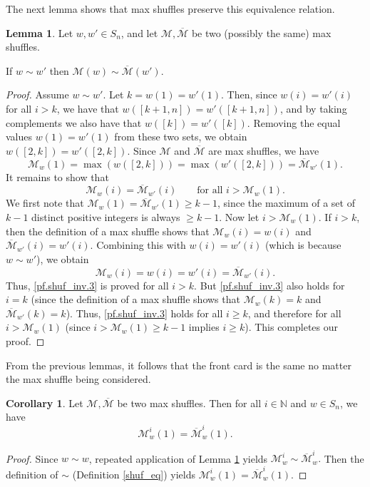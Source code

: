 \documentclass[final,nomarks]{dmtcs-episciences}
\theoremstyle{definition}
\newtheorem{lem}[thm]{Lemma}
\newtheorem{cor}[thm]{Corollary}
\theoremstyle{definition}
\theoremstyle{remark}
\newcommand{\M}{\mathcal{M}} %
\newcommand{\Mo}{\overline{\mathcal{M}}} %
\newcommand{\Mw}{\mathcal{M}_w} %
\newcommand{\Mow}{\Mo_w} %
\newcommand{\Mowp}{\Mo_{w'}} %
\newcommand{\tup}[1]{\left( #1 \right)}
\begin{document}
The next lemma shows that max shuffles preserve this equivalence relation.

\begin{lem}
    \label{shuf_inv}
    Let $w,w' \in S_n$, and let $\M,\Mo$ be two (possibly the same) max shuffles. 
    
    If $w \sim w'$ then $\M\tup{w} \sim \Mo\tup{w'}$.
\end{lem}

\begin{proof}
Assume $w \sim w'$.
Let $k = w\tup{1} = w'\tup{1}$.
Then, since $w\tup{i}=w'\tup{i}$ for all $i > k$, we have that $w\tup{[k+1,n]} = w'\tup{[k+1,n]}$, and by taking complements we also have that $w\tup{[k]}=w'\tup{[k]}$.
Removing the equal values $w(1) = w'(1)$ from these two sets, we obtain
$w\tup{[2,k]} = w'\tup{[2,k]}$.
Since $\M$ and $\Mo$ are max shuffles, we have
\[
\Mw\tup{1} = \max\tup{w\tup{[2,k]}} = \max\tup{w'\tup{[2,k]}} = \Mowp\tup{1}.
\]
It remains to show that
\begin{equation}
    \Mw\tup{i} = \Mowp\tup{i} \qquad \text{for all } i > \Mw\tup{1}.
    \label{pf.shuf_inv.3}
\end{equation}
We first note that $\Mw\tup{1} = \Mowp\tup{1} \ge k-1$, since the maximum of a set of $k-1$ distinct positive integers is always $\geq k-1$.
Now let $i > \Mw\tup{1}$.
If $i > k$, then the definition of a max shuffle shows that $\Mw\tup{i} = w\tup{i}$ and $ \Mowp\tup{i} = w'\tup{i}$. Combining this with $w\tup{i} = w'\tup{i} $ (which is because $w \sim w'$), we obtain
\[
\Mw\tup{i} = w\tup{i} = w'\tup{i} = \Mowp\tup{i} .
\]
Thus, \eqref{pf.shuf_inv.3} is proved for all $i > k$. But \eqref{pf.shuf_inv.3} also holds for $i = k$ (since the definition of a max shuffle shows that $\Mw\tup{k} = k$ and $\Mowp\tup{k} = k$).
Thus, \eqref{pf.shuf_inv.3} holds for all $i \geq k$, and therefore for all $i > \Mw\tup{1}$ (since $i > \Mw\tup{1} \ge k-1 $ implies $i \ge k$).
This completes our proof.
\end{proof}

From the previous lemmas, it follows that the front card is the same no matter the max shuffle being considered.
\begin{cor}
    \label{f_match}
    Let $ \M,\Mo $ be two max shuffles. Then for all $i \in \mathbb{N} $ and $w \in S_n$, we have
    \[
    \Mw^{i}\tup{ 1 } = \Mow^{i}\tup{ 1 }.
    \]
\end{cor}
\begin{proof}
Since $w \sim w$, repeated application of Lemma \ref{shuf_inv} yields $\Mw^{i} \sim \Mow^{i}.$ Then the definition of $\sim$ (Definition \ref{shuf_eq}) yields $\Mw^{i}\tup{ 1 } = \Mow^{i}\tup{ 1 }$. 
\end{proof}
\end{document}
